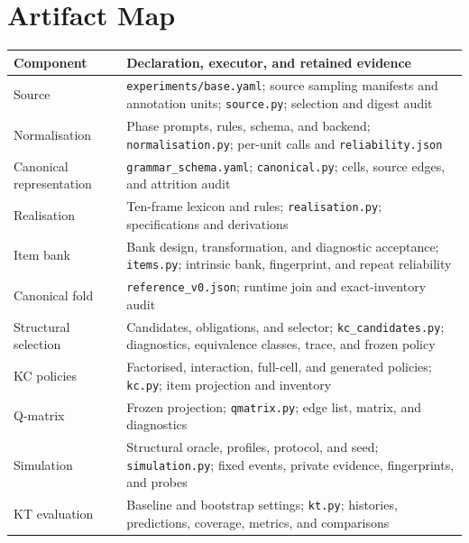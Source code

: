\section{Artifact Map}
\label{sec:artifact-map}

\begin{center}
  \footnotesize
  \begin{tabularx}{\columnwidth}{@{}l >{\raggedright\arraybackslash}X@{}}
    \toprule
    Component & Declaration, executor, and retained evidence \\
    \midrule
    Source
      & \texttt{experiments/base.yaml}; source sampling manifests and annotation
        units; \texttt{source.py}; selection and digest audit \\
    Normalisation
      & Phase prompts, rules, schema, and backend; \texttt{normalisation.py};
        per-unit calls and \texttt{reliability.json} \\
    Canonical representation
      & \texttt{grammar\_schema.yaml}; \texttt{canonical.py}; cells, source
        edges, and attrition audit \\
    Realisation
      & Ten-frame lexicon and rules; \texttt{realisation.py}; specifications
        and derivations \\
    Item bank
      & Bank design, transformation, and diagnostic acceptance;
        \texttt{items.py}; intrinsic bank, fingerprint, and repeat reliability \\
    Canonical fold
      & \texttt{reference\_v0.json}; runtime join and exact-inventory audit \\
    Structural selection
      & Candidates, obligations, and selector; \texttt{kc\_candidates.py};
        diagnostics, equivalence classes, trace, and frozen policy \\
    KC policies
      & Factorised, interaction, full-cell, and generated policies;
        \texttt{kc.py}; item projection and inventory \\
    Q-matrix
      & Frozen projection; \texttt{qmatrix.py}; edge list, matrix, and diagnostics \\
    Simulation
      & Structural oracle, profiles, protocol, and seed; \texttt{simulation.py};
        fixed events, private evidence, fingerprints, and probes \\
    KT evaluation
      & Baseline and bootstrap settings; \texttt{kt.py}; histories,
        predictions, coverage, metrics, and comparisons \\
    \bottomrule
  \end{tabularx}
  \captionsetup{hypcap=false}
  \label{tab:artifact-map}
\end{center}

